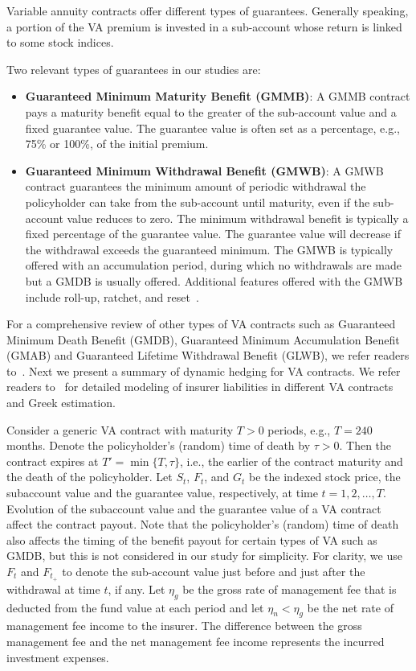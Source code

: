\documentclass[]{article}
\begin{document}
Variable annuity contracts offer different types of guarantees.
Generally speaking, a portion of the VA premium is invested in a sub-account whose return is linked to some stock indices.

Two relevant types of guarantees in our studies are:
\begin{itemize}[noitemsep]
    \item \textbf{Guaranteed Minimum Maturity Benefit (GMMB)}: A GMMB contract pays a maturity benefit equal to the greater of the sub-account value and a fixed guarantee value.
    The guarantee value is often set as a percentage, e.g., 75\% or 100\%, of the initial premium.

    \item \textbf{Guaranteed Minimum Withdrawal Benefit (GMWB)}: A GMWB contract guarantees the minimum amount of periodic withdrawal the policyholder can take from the sub-account until maturity, even if the sub-account value reduces to zero.
    The minimum withdrawal benefit is typically a fixed percentage of the guarantee value.
    The guarantee value will decrease if the withdrawal exceeds the guaranteed minimum. The GMWB is typically offered with an accumulation period, during which no withdrawals are made but a GMDB is usually offered. Additional features offered with the GMWB include roll-up, ratchet, and reset~\citep{geneva2013variable}.
\end{itemize}
For a comprehensive review of other types of VA contracts such as Guaranteed Minimum Death Benefit (GMDB), Guaranteed Minimum Accumulation Benefit (GMAB) and Guaranteed Lifetime Withdrawal Benefit (GLWB), we refer readers to~\cite{hardy2003investment}.
Next we present a summary of dynamic hedging for VA contracts.
We refer readers to~\cite{dang2021efficient} for detailed modeling of insurer liabilities in different VA contracts and Greek estimation.

Consider a generic VA contract with maturity $T>0$ periods, e.g., $T=240$ months.
Denote the policyholder's (random) time of death by $\tau>0$.
Then the contract expires at $T'=\min\{T,\tau\}$, i.e., the earlier of the contract maturity and the death of the policyholder.
Let $S_t$, $F_t$, and $G_t$ be the indexed stock price, the subaccount value and the guarantee value, respectively, at time $t=1,2,\ldots,T$.
Evolution of the subaccount value and the guarantee value of a VA contract affect the contract payout.
Note that the policyholder's (random) time of death also affects the timing of the benefit payout for certain types of VA such as GMDB, but this is not considered in our study for simplicity.
For clarity, we use $F_t$ and $F_{t_+}$ to denote the sub-account value just before and just after the withdrawal at time $t$, if any.
Let $\eta_g$ be the gross rate of management fee that is deducted from the fund value at each period and let $\eta_n < \eta_g$ be the net rate of management fee income to the insurer.
The difference between the gross management fee and the net management fee income represents the incurred investment expenses.
\end{document}
